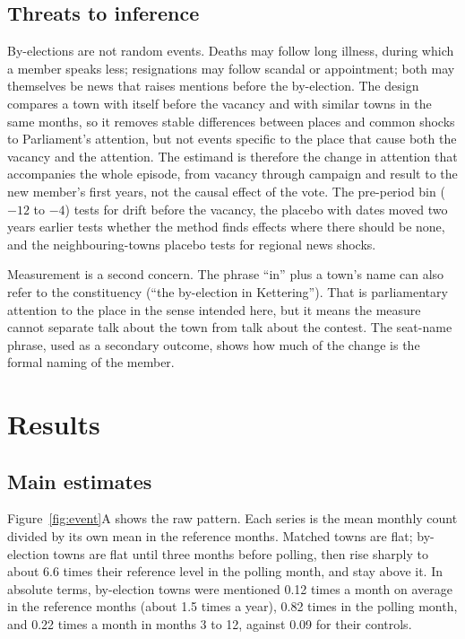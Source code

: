 \documentclass[11pt,a4paper]{article}
\begin{document}
\subsection{Threats to inference}
By-elections are not random events. Deaths may follow long illness, during which a member speaks less; resignations may follow scandal or appointment; both may themselves be news that raises mentions before the by-election. The design compares a town with itself before the vacancy and with similar towns in the same months, so it removes stable differences between places and common shocks to Parliament's attention, but not events specific to the place that cause both the vacancy and the attention. The estimand is therefore the change in attention that accompanies the whole episode, from vacancy through campaign and result to the new member's first years, not the causal effect of the vote. The pre-period bin ($-12$ to $-4$) tests for drift before the vacancy, the placebo with dates moved two years earlier tests whether the method finds effects where there should be none, and the neighbouring-towns placebo tests for regional news shocks.

Measurement is a second concern. The phrase ``in'' plus a town's name can also refer to the constituency (``the by-election in Kettering''). That is parliamentary attention to the place in the sense intended here, but it means the measure cannot separate talk about the town from talk about the contest. The seat-name phrase, used as a secondary outcome, shows how much of the change is the formal naming of the member.

\section{Results}\label{sec:results}
\subsection{Main estimates}
Figure~\ref{fig:event}A shows the raw pattern. Each series is the mean monthly count divided by its own mean in the reference months. Matched towns are flat; by-election towns are flat until three months before polling, then rise sharply to about 6.6 times their reference level in the polling month, and stay above it. In absolute terms, by-election towns were mentioned 0.12 times a month on average in the reference months (about 1.5 times a year), 0.82 times in the polling month, and 0.22 times a month in months 3 to 12, against 0.09 for their controls.
\end{document}
